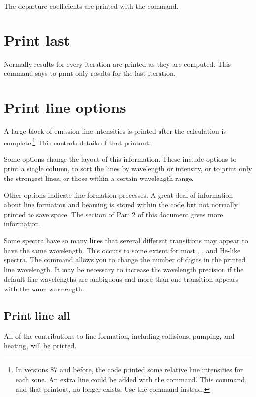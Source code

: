 The departure coefficients are printed with the  command.

\section{Print last}

Normally results for every iteration are printed as they are computed.
This command says to print only results for the last iteration.

\section{Print line options}

A large block of emission-line intensities is printed after the
calculation is complete.\footnote{In versions 87 and before, the code printed some relative line
intensities for each zone.  An extra line could be added with the  command.  This command, and that printout, no longer exists.  Use the
 command instead.} This controls details of that printout.

Some options change the layout of this information.
These include options
to print a single column, to sort the lines by wavelength or intensity,
or to print only the strongest lines, or those within a certain wavelength
range.

Other options indicate line-formation processes.
A great deal of
information about line formation and beaming is stored within the code but
not normally printed to save space.
The section of Part 2 of this document
 gives more information.

Some spectra have so many lines that several different transitions may
appear to have the same wavelength.
This occurs to some extent for most
\htwo, \feii, and He-like spectra.
The  command allows you to change the number of digits in
the printed line wavelength.
It may be necessary to increase the wavelength
precision if the default line wavelengths are ambiguous and more than one
transition appears with the same wavelength.

\subsection{Print line all}

All of the contributions to line formation, including collisions, pumping,
and heating, will be printed.

